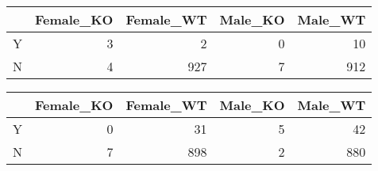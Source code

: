 \documentclass[]{article}
\begin{document}
\begin{longtable}[c]{@{}lrrrr@{}}
\toprule
& Female\_KO & Female\_WT & Male\_KO & Male\_WT\tabularnewline
\midrule
\endhead
Y & 3 & 2 & 0 & 10\tabularnewline
N & 4 & 927 & 7 & 912\tabularnewline
\bottomrule
\end{longtable}

\begin{longtable}[c]{@{}lrrrr@{}}
\toprule
& Female\_KO & Female\_WT & Male\_KO & Male\_WT\tabularnewline
\midrule
\endhead
Y & 0 & 31 & 5 & 42\tabularnewline
N & 7 & 898 & 2 & 880\tabularnewline
\bottomrule
\end{longtable}
\end{document}
